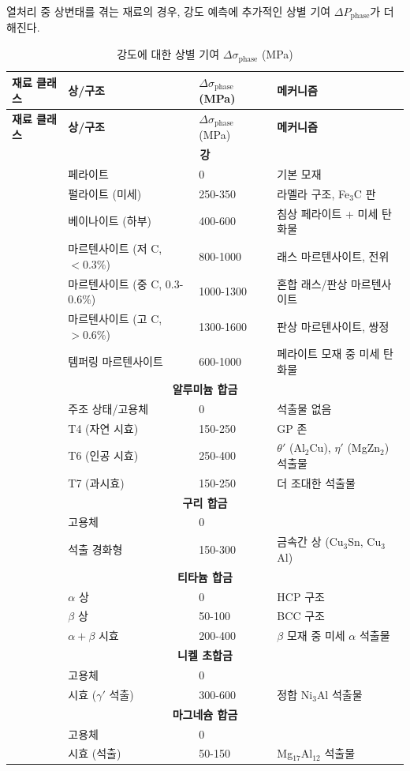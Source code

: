 \documentclass[12pt,a4paper]{article}
\begin{document}
	열처리 중 상변태를 겪는 재료의 경우, 강도 예측에 추가적인 상별 기여 \(\Delta P_{\text{phase}}\)가 더해진다.
	
	\begin{longtable}{p{3.5cm}p{3.0cm}p{3.0cm}p{4cm}}
		\caption{강도에 대한 상별 기여 \(\Delta\sigma_{\text{phase}}\) (MPa)} \label{tab:phase-contributions} \\
		\toprule
		\textbf{재료 클래스} & \textbf{상/구조} & \(\Delta\sigma_{\text{phase}}\) (MPa) & \textbf{메커니즘} \\
		\midrule
		\endfirsthead
		\toprule
		\textbf{재료 클래스} & \textbf{상/구조} & \(\Delta\sigma_{\text{phase}}\) (MPa) & \textbf{메커니즘} \\
		\midrule
		\endhead
		\multicolumn{4}{c}{\textbf{강}} \\
		& 페라이트 & 0 & 기본 모재 \\
		& 펄라이트 (미세) & 250-350 & 라멜라 구조, Fe\(_3\)C 판 \\
		& 베이나이트 (하부) & 400-600 & 침상 페라이트 + 미세 탄화물 \\
		& 마르텐사이트 (저 C, \(<0.3\%\)) & 800-1000 & 래스 마르텐사이트, 전위 \\
		& 마르텐사이트 (중 C, 0.3-0.6\%) & 1000-1300 & 혼합 래스/판상 마르텐사이트 \\
		& 마르텐사이트 (고 C, \(>0.6\%\)) & 1300-1600 & 판상 마르텐사이트, 쌍정 \\
		& 템퍼링 마르텐사이트 & 600-1000 & 페라이트 모재 중 미세 탄화물 \\
		\hline
		\multicolumn{4}{c}{\textbf{알루미늄 합금}} \\
		& 주조 상태/고용체 & 0 & 석출물 없음 \\
		& T4 (자연 시효) & 150-250 & GP 존 \\
		& T6 (인공 시효) & 250-400 & \(\theta'\) (Al\(_2\)Cu), \(\eta'\) (MgZn\(_2\)) 석출물 \\
		& T7 (과시효) & 150-250 & 더 조대한 석출물 \\
		\hline
		\multicolumn{4}{c}{\textbf{구리 합금}} \\
		& 고용체 & 0 & \\
		& 석출 경화형 & 150-300 & 금속간 상 (Cu\(_3\)Sn, Cu\(_3\)Al) \\
		\hline
		\multicolumn{4}{c}{\textbf{티타늄 합금}} \\
		& \(\alpha\) 상 & 0 & HCP 구조 \\
		& \(\beta\) 상 & 50-100 & BCC 구조 \\
		& \(\alpha+\beta\) 시효 & 200-400 & \(\beta\) 모재 중 미세 \(\alpha\) 석출물 \\
		\hline
		\multicolumn{4}{c}{\textbf{니켈 초합금}} \\
		& 고용체 & 0 & \\
		& 시효 (\(\gamma'\) 석출) & 300-600 & 정합 Ni\(_3\)Al 석출물 \\
		\hline
		\multicolumn{4}{c}{\textbf{마그네슘 합금}} \\
		& 고용체 & 0 & \\
		& 시효 (석출) & 50-150 & Mg\(_{17}\)Al\(_{12}\) 석출물 \\
		\bottomrule
	\end{longtable}
	
\end{document}

